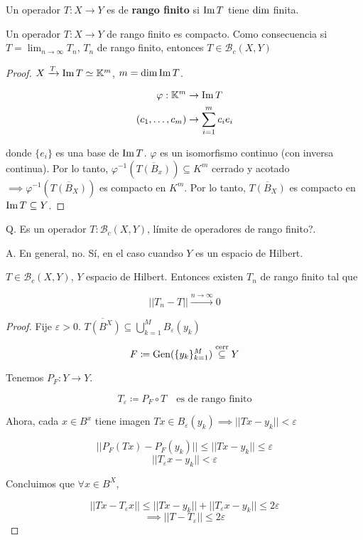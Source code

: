  \begin{fdefinition}
    Un operador $T:X\to Y$ es de \textbf{rango finito} si $\operatorname{Im} T$ tiene $\operatorname{dim}$ finita.
 \end{fdefinition}

 \begin{fproposition}
    Un operador $T:X\to Y$ de rango finito es compacto. Como consecuencia si $T=\lim_{n\to\infty}T_n$, $T_n$ de rango finito, entonces $T\in\mathcal{B}_c(X,Y)$
 \end{fproposition}

 \begin{proof}
    $X\xrightarrow{T}\operatorname{Im} T\simeq \mathbb{K}^m$, $m=\operatorname{dim} \operatorname{Im} T$.

    \begin{align*}
        \varphi:\mathbb{K}^m&\to\operatorname{Im} T\\
        (c_1,\ldots,c_m)&\to \sum_{i=1}^m c_ie_i
    \end{align*}

    donde $\{e_i\}$ es una base de $\operatorname{Im} T$. $\varphi$ es un isomorfismo continuo (con inversa continua). Por lo tanto, $\varphi^{-1}(\overline{T(B_x)})\subseteq K^m$ cerrado y acotado $\implies \varphi^{-1}(\overline{T(B_X)})$ es compacto en $K^m$. Por lo tanto, $\overline{T(B_X)}$ es compacto en $\operatorname{Im} T\subseteq Y$.
 \end{proof}

Q. Es un operador $T:\mathcal{B}_c(X,Y)$, límite de operadores de rango finito?.

A. En general, no. Sí, en el caso cuandso $Y$ es un espacio de Hilbert.

\begin{ftheorem}
    $T\in \mathcal{B}_c(X,Y)$, $Y$ espacio de Hilbert. Entonces existen $T_n$ de rango finito tal que 

    \[||T_n-T||\xrightarrow{n\to\infty}0\]
\end{ftheorem}

\begin{proof}
    Fije $\varepsilon>0$. $\overline{T(B^X)}\subseteq \bigcup_{k=1}^M B_\varepsilon(y_k)$

    \[F\coloneqq \operatorname{Gen}(\{y_k\}_{k=1}^M)\overset{\text{cerr}}{\subseteq} Y\]

    Tenemos $P_F:Y\to Y$.

    \[T_\varepsilon\coloneqq P_F\circ T\quad\text{es de rango finito}\]

    Ahora, cada $x\in B^x$ tiene imagen $Tx\in B_\varepsilon(y_k)\implies ||Tx-y_k||<\varepsilon$

    \[||P_F(Tx)-P_F(y_k)||\leq ||Tx-y_k||\leq\varepsilon\]
    \[||T_\varepsilon x-y_k||<\varepsilon\]

    Concluimos que $\forall x\in B^X$,

    \[||Tx-T_\varepsilon x||\leq ||Tx-y_k||+||T_\varepsilon x-y_k||\leq 2\varepsilon\]
    \[\implies ||T-T_\varepsilon||\leq 2\varepsilon\]
\end{proof}

